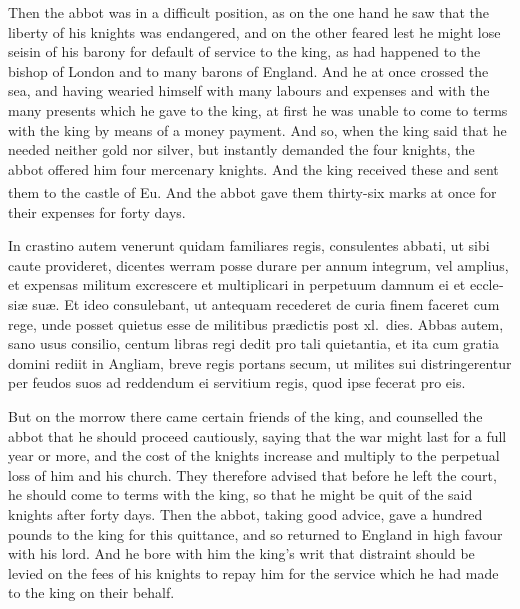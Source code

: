 \documentclass{book}
\newcounter{engnote}
\newcommand{\engnotenum}{\textsuperscript{\arabic{engnote}\stepcounter{engnote}}}
\begin{document}
\begin{paracol}{2}
\switchcolumn

Then the abbot was in a difficult position, as on the one hand he saw that the liberty of his knights was endangered, and on the other feared lest he might lose seisin of his barony for default of service to the king, as had happened to the bishop of London and to many barons of England. And he at once crossed the sea, and having wearied himself with many labours and expenses and with the many presents which he gave to the king, at first he was unable to come to terms with the king by means of a money payment. And so, when the king said that he needed neither gold nor silver, but instantly demanded the four knights, the abbot offered him four mercenary knights. And the king received these and sent them to the castle of Eu.\engnotenum{} And the abbot gave them thirty-six marks at once for their expenses for forty days.

\switchcolumn*

\begin{otherlanguage}{latin}
In crastino autem venerunt quidam familiares regis, consulentes abbati, ut sibi caute provideret, dicentes werram posse durare per annum integrum, vel amplius, et expensas militum excrescere et multiplicari in perpetuum damnum ei et ecclesi\ae{} su\ae{}. Et ideo consulebant, ut antequam recederet de curia finem faceret cum rege, unde posset quietus esse de militibus pr\ae{}dictis post xl.\ dies. Abbas autem, sano usus consilio, centum libras regi dedit pro tali quietantia, et ita cum gratia domini rediit in Angliam, breve regis portans secum, ut milites sui distringerentur per feudos suos ad reddendum ei servitium regis, quod ipse fecerat pro eis.
\end{otherlanguage}

\switchcolumn

But on the morrow there came certain friends of the king, and counselled the abbot that he should proceed cautiously, saying that the war might last for a full year or more, and the cost of the knights increase and multiply to the perpetual loss of him and his church. They therefore advised that before he left the court, he should come to terms with the king, so that he might be quit of the said knights after forty days. Then the abbot, taking good advice, gave a hundred pounds to the king for this quittance, and so returned to England in high favour with his lord. And he bore with him the king's writ that distraint should be levied on the fees of his knights to repay him for the service which he had made to the king on their behalf.


\end{paracol}
\end{document}
